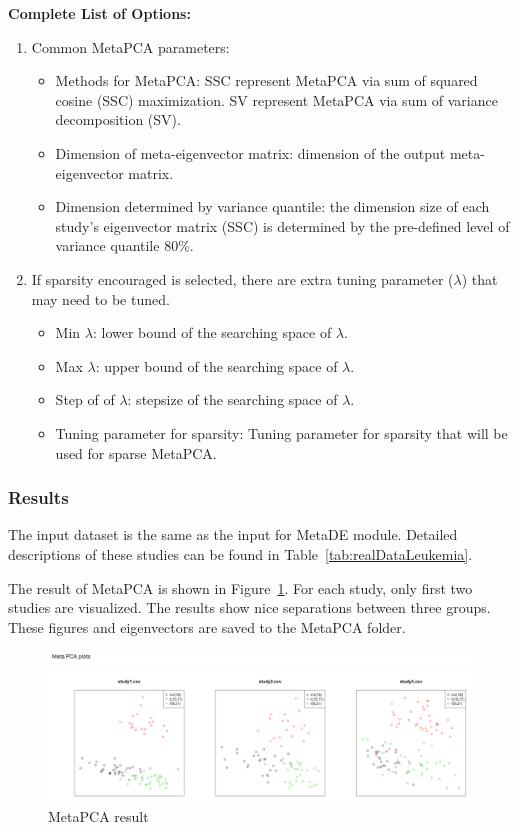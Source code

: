 \textbf{Complete List of Options:} 
\begin{enumerate}
\item Common MetaPCA parameters: 

\begin{itemize}
\item Methods for MetaPCA:
SSC represent MetaPCA via sum of squared cosine (SSC) maximization.
SV represent MetaPCA via sum of variance decomposition (SV).
\item Dimension of meta-eigenvector matrix: dimension of the output meta-eigenvector matrix.
\item Dimension determined by variance quantile:
the dimension size of each study's eigenvector matrix (SSC) is determined  by the pre-defined level of variance quantile 80\%.
\end{itemize}

\item If sparsity encouraged is selected, there are extra tuning parameter ($\lambda$) that may need to be tuned.

\begin{itemize}
\item  Min $\lambda$: lower bound of the searching space of $\lambda$.
\item Max $\lambda$: upper bound of the searching space of $\lambda$.
\item Step of of $\lambda$: stepsize of the searching space of $\lambda$.
\item Tuning parameter for sparsity: Tuning parameter for sparsity that will be used for sparse MetaPCA.
\end{itemize}


\end{enumerate}


\subsubsection{Results}
The input dataset is the same as the input for MetaDE module.
Detailed descriptions of these studies can be found in Table~\ref{tab:realDataLeukemia}. 

The result of MetaPCA is shown in Figure~\ref{fig:metaPCAresult}.
For each study, only first two studies are visualized.
The results show nice separations between three groups.
These figures and eigenvectors are saved to the MetaPCA folder.

\begin{figure}[H]
\begin{center}
\includegraphics[scale=0.3]{./figure/metaPCA/metaPCA}
\caption{MetaPCA result}
\label{fig:metaPCAresult}
\end{center}
\end{figure}

